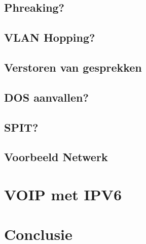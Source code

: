 \documentclass[pdftex,a4paper,12pt,twoside]{report}
\begin{document}
\newpage

\section{Phreaking?}
\section{VLAN Hopping?}
\section{Verstoren van gesprekken}
\section{DOS aanvallen?}
\section{SPIT?}
\section{Voorbeeld Netwerk}

\chapter{VOIP met IPV6}
\label{ch:VOIP met IPV6}




\chapter{Conclusie}
\label{ch:conclusie}








\listoffigures
\listoftables
\end{document}
